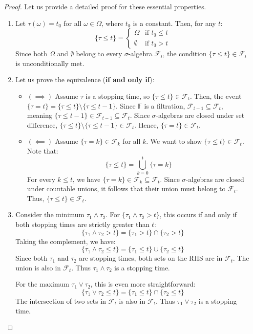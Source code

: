 \begin{proof}
Let us provide a detailed proof for these essential properties.
\begin{enumerate}[label=(\alph*)]
    \item Let $\tau(\omega) = t_0$ for all $\omega \in \Omega$, where $t_0$ is a constant. Then, for any $t$:
    $$ 
    \{\tau \leq t\} = 
    \begin{cases} 
    \Omega & \text{if } t_0 \leq t \\
    \emptyset & \text{if } t_0 > t
    \end{cases}
    $$
    Since both $\Omega$ and $\emptyset$ belong to every $\sigma$-algebra $\mathcal{F}_t$, the condition $\{\tau \leq t\} \in \mathcal{F}_t$ is unconditionally met.

    \item Let us prove the equivalence (\textbf{if and only if}):
    \begin{itemize}
        \item $(\implies)$ Assume $\tau$ is a stopping time, so $\{\tau \leq t\} \in \mathcal{F}_t$. Then, the event $\{\tau = t\} = \{\tau \leq t\} \setminus \{\tau \leq t-1\}$.
        Since $\mathbb{F}$ is a filtration, $\mathcal{F}_{t-1} \subseteq \mathcal{F}_t$, meaning $\{\tau \leq t-1\} \in \mathcal{F}_{t-1} \subseteq \mathcal{F}_t$. Since $\sigma$-algebras are closed under set difference, $\{\tau \leq t\} \setminus \{\tau \leq t-1\} \in \mathcal{F}_t$. Hence, $\{\tau = t\} \in \mathcal{F}_t$.
        \item $(\impliedby)$ Assume $\{\tau = k\} \in \mathcal{F}_k$ for all $k$. We want to show $\{\tau \leq t\} \in \mathcal{F}_t$. Note that:
        $$ \{\tau \leq t\} = \bigcup_{k=0}^t \{\tau = k\} $$
        For every $k \leq t$, we have $\{\tau = k\} \in \mathcal{F}_k \subseteq \mathcal{F}_t$. Since $\sigma$-algebras are closed under countable unions, it follows that their union must belong to $\mathcal{F}_t$. Thus, $\{\tau \leq t\} \in \mathcal{F}_t$.
    \end{itemize}

    \item Consider the minimum $\tau_1 \wedge \tau_2$. For $\{ \tau_1 \wedge \tau_2 > t \}$, this occurs if and only if both stopping times are strictly greater than $t$:
    $$ \{\tau_1 \wedge \tau_2 > t\} = \{\tau_1 > t\} \cap \{\tau_2 > t\} $$
    Taking the complement, we have:
    $$ \{\tau_1 \wedge \tau_2 \leq t\} = \{\tau_1 \leq t\} \cup \{\tau_2 \leq t\} $$
    Since both $\tau_1$ and $\tau_2$ are stopping times, both sets on the RHS are in $\mathcal{F}_t$. The union is also in $\mathcal{F}_t$. Thus $\tau_1 \wedge \tau_2$ is a stopping time.

    For the maximum $\tau_1 \vee \tau_2$, this is even more straightforward:
    $$ \{\tau_1 \vee \tau_2 \leq t\} = \{\tau_1 \leq t\} \cap \{\tau_2 \leq t\} $$
    The intersection of two sets in $\mathcal{F}_t$ is also in $\mathcal{F}_t$. Thus $\tau_1 \vee \tau_2$ is a stopping time.
\end{enumerate}
\end{proof}

